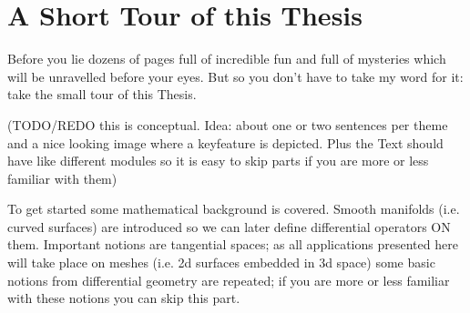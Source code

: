 


\section{A Short Tour of this Thesis}
Before you lie dozens of pages full of incredible fun and full of mysteries which will be unravelled before your eyes. But so you don't have to take my word for it: take the small tour of this Thesis.

(TODO/REDO this is conceptual. Idea: about one or two sentences per theme and a nice looking image where a keyfeature is depicted. Plus the Text should have like different modules so it is easy to skip parts if you are more or less familiar with them)

To get started some mathematical background is covered. Smooth manifolds (i.e. curved surfaces) are introduced so we can later define differential operators ON them. Important notions are tangential spaces; as all applications presented here will take place on meshes (i.e. 2d surfaces embedded in 3d space) some basic notions from differential geometry are repeated; if you are more or less familiar with these notions you can skip this part.


